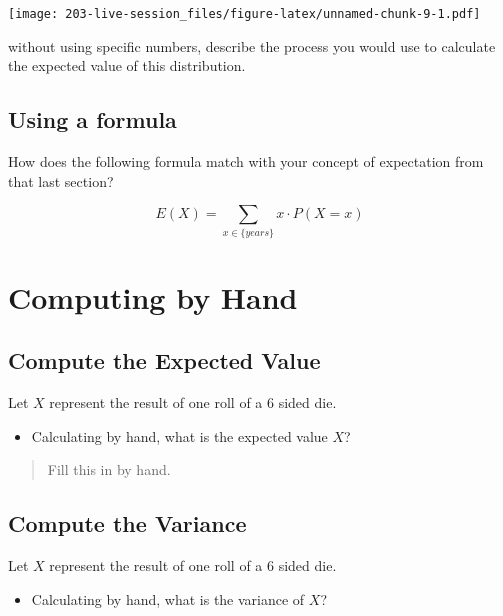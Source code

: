 \documentclass[
]{book}
\providecommand{\tightlist}{%
  \setlength{\itemsep}{0pt}\setlength{\parskip}{0pt}}
\theoremstyle{definition}
\theoremstyle{definition}
\theoremstyle{definition}
\theoremstyle{definition}
\theoremstyle{remark}
\begin{document}
\texttt{[image: 203-live-session\_files/figure-latex/unnamed-chunk-9-1.pdf]}

without using specific numbers, describe the process you would use to calculate the expected value of this distribution.

\hypertarget{using-a-formula}{%
\subsection{Using a formula}\label{using-a-formula}}

How does the following formula match with your concept of expectation from that last section?

\[
  E(X) = \sum_{x \in \{years\}} x \cdot P(X=x)
\]

\hypertarget{computing-by-hand}{%
\section{Computing by Hand}\label{computing-by-hand}}

\hypertarget{compute-the-expected-value}{%
\subsection{Compute the Expected Value}\label{compute-the-expected-value}}

Let \(X\) represent the result of one roll of a 6 sided die.

\begin{itemize}
\tightlist
\item
  Calculating by hand, what is the expected value \(X\)?
\end{itemize}

\begin{quote}
Fill this in by hand.
\end{quote}

\hypertarget{compute-the-variance}{%
\subsection{Compute the Variance}\label{compute-the-variance}}

Let \(X\) represent the result of one roll of a 6 sided die.

\begin{itemize}
\tightlist
\item
  Calculating by hand, what is the variance of \(X\)?
\end{itemize}
\end{document}
